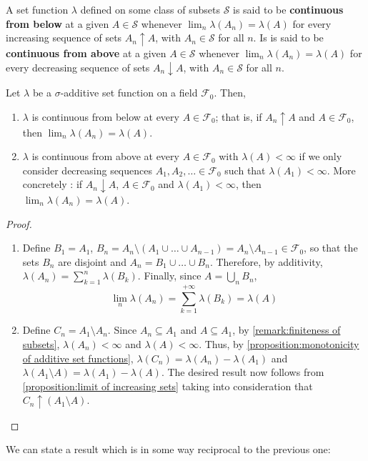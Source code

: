 \begin{defn} A set function \(\lambda\) defined on some class of
subsets \(\mathcal{S}\) is said to be \textbf{continuous from below} at a given
\(A\in\mathcal{S}\) whenever \(\lim_{n}\lambda(A_{n})=\lambda(A)\) for every increasing
sequence of sets \(A_{n}\uparrow A\), with \(A_{n}\in\mathcal{S}\) for all \(n\). Is is
said to be \textbf{continuous from above} at a given \(A\in\mathcal{S}\) whenever
\(\lim_{n}\lambda(A_{n})=\lambda(A)\) for every decreasing sequence of sets
\(A_{n}\downarrow A\), with \(A_{n}\in\mathcal{S}\) for all \(n\).
\end{defn}
\begin{prop}\label{proposition:limits of monotone sequences of sets} Let
\(\lambda\) be a \(\sigma\)-additive set function on a field \(\mathcal{F}_0\). Then,
		\begin{enumerate}
			\item \label{proposition:limit of increasing sets} \(\lambda\) is
continuous from below at every \(A\in\mathcal{F}_0\); that is, if \(A_{n}\uparrow A\) and
\(A\in\mathcal{F}_0\), then \(\lim_{n}\lambda(A_{n})=\lambda(A)\).
			\item \label{proposition:limit of decreasing sets} \(\lambda\) is
continuous from above at every \(A\in\mathcal{F}_0\) with \(\lambda(A)<\infty\) if we only
consider decreasing sequences \(A_{1},A_{2},\dotsc\in\mathcal{F}_0\) such that
\(\lambda(A_{1})<\infty\). More concretely : if \(A_{n}\downarrow A\),
\(A\in\mathcal{F}_0\) and \(\lambda(A_{1})<\infty\), then
\(\lim_{n}\lambda(A_{n})=\lambda(A)\).
		\end{enumerate}
\end{prop}
\begin{proof}
		\begin{enumerate}
			\item Define \(B_1=A_1\),
\(B_{n}=A_{n}\setminus \left(A_{1}\cup\dotsc\cup A_{n-1}\right)=A_{n}\setminus A_{n-1}\in\mathcal{F}_0\),
so that the sets \(B_{n}\) are disjoint and \(A_{n}=B_{1}\cup\dotsc\cup B_{n}\).
Therefore, by additivity, \(\lambda(A_{n})=\sum_{k=1}^{n}\lambda(B_{k})\).
Finally, since \(A=\bigcup_{n}B_{n}\),
			\[
					\lim_{n}\lambda(A_{n})=\sum_{k=1}^{+\infty}\lambda(B_{k})=\lambda(A)
			\]
			\item Define \(C_{n}=A_{1}\setminus A_{n}\). Since
\(A_{n}\subseteq A_{1}\) and \(A\subseteq A_{1}\), by \cref{remark:finiteness of
subsets}, \(\lambda(A_{n})<\infty\) and \(\lambda(A)<\infty\). Thus, by
\cref{proposition:monotonicity of additive set functions},
\(\lambda(C_{n})=\lambda(A_{n})-\lambda(A_{1})\) and
\(\lambda(A_{1}\setminus A)=\lambda(A_{1})-\lambda(A)\). The desired result now
follows from \ref{proposition:limit of increasing sets} taking into
consideration that \(C_{n}\uparrow \left(A_{1}\setminus A\right)\).
		\end{enumerate}
\end{proof}
We can state a result which is in some way reciprocal to the previous one:
	
